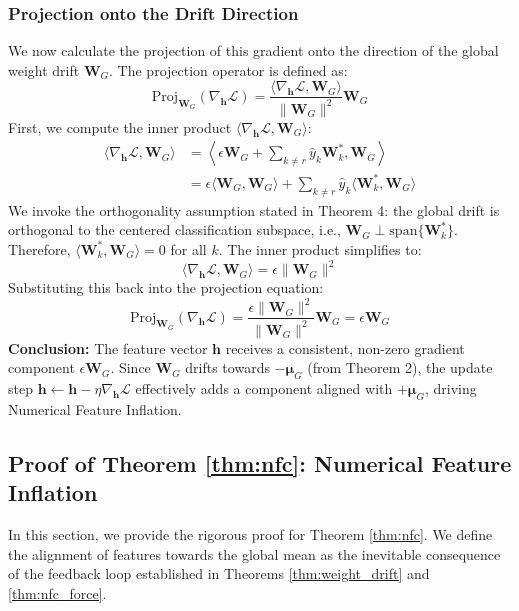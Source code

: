 \documentclass{article}
\theoremstyle{plain}
\theoremstyle{definition}
\theoremstyle{remark}
\begin{document}
\subsubsection{Projection onto the Drift Direction}
We now calculate the projection of this gradient onto the direction of the global weight drift $\bm{W}_G$. The projection operator is defined as:
\begin{equation}
    \text{Proj}_{\bm{W}_G}(\nabla_{\bm{h}} \mathcal{L}) = \frac{\langle \nabla_{\bm{h}} \mathcal{L}, \bm{W}_G \rangle}{\|\bm{W}_G\|^2} \bm{W}_G
\end{equation}
First, we compute the inner product $\langle \nabla_{\bm{h}} \mathcal{L}, \bm{W}_G \rangle$:
\begin{align}
    \langle \nabla_{\bm{h}} \mathcal{L}, \bm{W}_G \rangle &= \left\langle \epsilon \bm{W}_G + \sum_{k \neq r} \hat{y}_k \bm{W}_k^*, \bm{W}_G \right\rangle \\
    &= \epsilon \langle \bm{W}_G, \bm{W}_G \rangle + \sum_{k \neq r} \hat{y}_k \langle \bm{W}_k^*, \bm{W}_G \rangle
\end{align}
We invoke the orthogonality assumption stated in Theorem 4: the global drift is orthogonal to the centered classification subspace, i.e., $\bm{W}_G \perp \text{span}\{\bm{W}_k^*\}$. Therefore, $\langle \bm{W}_k^*, \bm{W}_G \rangle = 0$ for all $k$.
The inner product simplifies to:
\begin{equation}
    \langle \nabla_{\bm{h}} \mathcal{L}, \bm{W}_G \rangle = \epsilon \|\bm{W}_G\|^2
\end{equation}
Substituting this back into the projection equation:
\begin{equation}
    \text{Proj}_{\bm{W}_G}(\nabla_{\bm{h}} \mathcal{L}) = \frac{\epsilon \|\bm{W}_G\|^2}{\|\bm{W}_G\|^2} \bm{W}_G = \epsilon \bm{W}_G
\end{equation}
\textbf{Conclusion:} The feature vector $\bm{h}$ receives a consistent, non-zero gradient component $\epsilon \bm{W}_G$. Since $\bm{W}_G$ drifts towards $-\bm{\mu}_G$ (from Theorem 2), the update step $\bm{h} \leftarrow \bm{h} - \eta \nabla_{\bm{h}} \mathcal{L}$ effectively adds a component aligned with $+\bm{\mu}_G$, driving Numerical Feature Inflation.

\subsection{Proof of Theorem \ref{thm:nfc}: Numerical Feature Inflation}
\label{app:proof_nfc}
In this section, we provide the rigorous proof for Theorem \ref{thm:nfc}. 
We define the alignment of features towards the global mean as the inevitable consequence of 
the feedback loop established in Theorems \ref{thm:weight_drift} and \ref{thm:nfc_force}.
\end{document}
